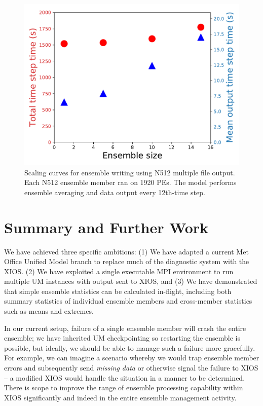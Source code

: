 \documentclass[twocolumn, 12pt]{paper}
\begin{document}
\begin{figure}[H]
	\includegraphics[width=\columnwidth]{figures/ens-n512.pdf}
	\caption{Scaling curves for ensemble writing using N512 multiple file output. Each N512 ensemble member ran on 1920 PEs. The model performs ensemble averaging and data output every 12th-time step.}
  \label{first-ensemble-runs-n512}
\end{figure}



\section{Summary and Further Work}
\label{summary}

We have achieved three specific ambitions: (1) We have adapted a current Met Office Unified Model branch to replace much of the diagnostic system with the XIOS.
(2) We have exploited a single executable MPI environment to run multiple UM instances with output sent to XIOS, and (3) We have demonstrated that simple ensemble statistics can be calculated in-flight, including both summary statistics of individual ensemble members and cross-member statistics such as means and extremes.

In our current setup, failure of a single ensemble member will crash the entire ensemble; we have inherited UM checkpointing so restarting the ensemble is possible, but ideally, we should be able to manage such a failure more gracefully.
For example, we can imagine a scenario whereby we would trap ensemble member errors and subsequently send \textit{missing data} or otherwise signal the failure to XIOS -- a modified XIOS would handle the situation in a manner to be determined.
There is scope to improve the range of ensemble processing capability within XIOS significantly and indeed in the entire ensemble management activity.
\end{document}
